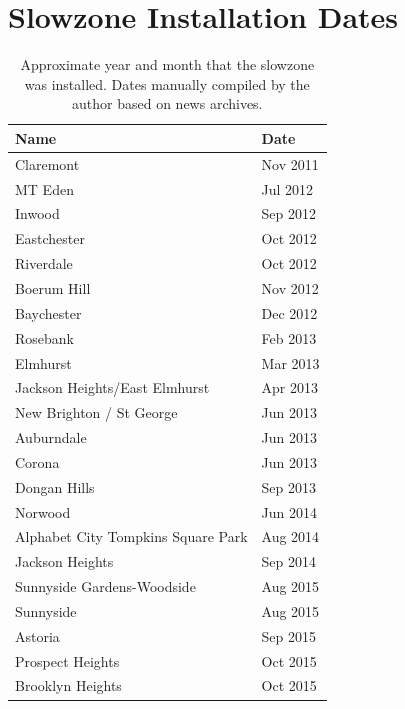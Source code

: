 \documentclass[10pt,journal,compsoc]{IEEEtran}
\begin{document}
\section{Slowzone Installation Dates}
\label{sec:appendixa}
\begin{table}[h!]
\centering

\caption*{Approximate year and month that the slowzone was installed.  Dates manually compiled by the author based on news archives. }

\begin{tabular}{|l|l|}
\hline
                                  Name &  Date \\ \hline
                          Claremont &  Nov 2011 \\ \hline
                            MT Eden &  Jul 2012 \\ \hline
                             Inwood &  Sep 2012 \\ \hline
                        Eastchester &  Oct 2012 \\ \hline
                          Riverdale &  Oct 2012 \\ \hline
                        Boerum Hill &  Nov 2012 \\ \hline
                         Baychester &  Dec 2012 \\ \hline
                           Rosebank &  Feb 2013 \\ \hline
                           Elmhurst &  Mar 2013 \\ \hline
      Jackson Heights/East Elmhurst &  Apr 2013 \\ \hline
           New Brighton / St George &  Jun 2013 \\ \hline
                         Auburndale &  Jun 2013 \\ \hline
                             Corona &  Jun 2013 \\ \hline
                       Dongan Hills &  Sep 2013 \\ \hline
                           Norwood &  Jun 2014 \\ \hline
 Alphabet City Tompkins Square Park &  Aug 2014 \\ \hline
                    Jackson Heights &  Sep 2014 \\ \hline
         Sunnyside Gardens-Woodside &  Aug 2015 \\ \hline
                          Sunnyside &  Aug 2015 \\ \hline
                            Astoria &  Sep 2015 \\ \hline
                   Prospect Heights &  Oct 2015 \\ \hline
                   Brooklyn Heights &  Oct 2015 \\ \hline
\end{tabular}
\end{table}
\end{document}
